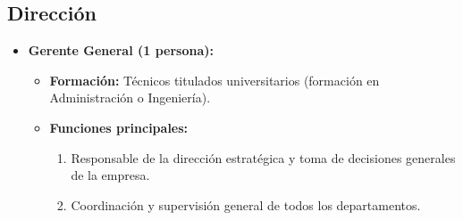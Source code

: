 \subsection{Dirección}
\begin{itemize}[leftmargin=*]
    \item \textbf{Gerente General (1 persona):}
          \begin{itemize}
              \item \textbf{Formación:} Técnicos titulados universitarios (formación en Administración o Ingeniería).
              \item \textbf{Funciones principales:}
                    \begin{enumerate}
                        \item Responsable de la dirección estratégica y toma de decisiones generales de la empresa.
                        \item Coordinación y supervisión general de todos los departamentos.
                    \end{enumerate}
          \end{itemize}
\end{itemize}

